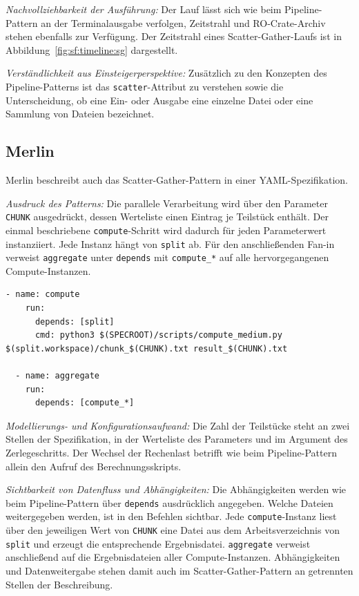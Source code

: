 \emph{Nachvollziehbarkeit der Ausführung:} Der Lauf lässt sich wie
beim Pipeline-Pattern an der Terminalausgabe verfolgen, Zeitstrahl
und RO-Crate-Archiv stehen ebenfalls zur Verfügung. Der Zeitstrahl
eines Scatter-Gather-Laufs ist in
Abbildung~\ref{fig:sf:timeline:sg} dargestellt.

\emph{Verständlichkeit aus Einsteigerperspektive:} Zusätzlich zu den
Konzepten des Pipeline-Patterns ist das \texttt{scatter}-Attribut zu
verstehen sowie die Unterscheidung, ob eine Ein- oder Ausgabe eine
einzelne Datei oder eine Sammlung von Dateien bezeichnet.

\subsection{Merlin}
\label{sec:lokal:sg:merlin}

Merlin beschreibt auch das Scatter-Gather-Pattern in einer
YAML-Spezifikation.

\emph{Ausdruck des Patterns:} Die parallele Verarbeitung wird über
den Parameter \texttt{CHUNK} ausgedrückt, dessen Werteliste einen
Eintrag je Teilstück enthält. Der einmal beschriebene
\texttt{compute}-Schritt wird dadurch für jeden Parameterwert
instanziiert. Jede Instanz hängt von \texttt{split} ab. Für den
anschließenden Fan-in verweist \texttt{aggregate} unter
\texttt{depends} mit \texttt{compute\_*} auf alle hervorgegangenen Compute-Instanzen.

\begin{lstlisting}[caption={Parametrisierter Verarbeitungsschritt und Fan-in (Merlin, Scatter-Gather)},label={lst:sg:me}]
  - name: compute
    run:
      depends: [split]
      cmd: python3 $(SPECROOT)/scripts/compute_medium.py $(split.workspace)/chunk_$(CHUNK).txt result_$(CHUNK).txt

  - name: aggregate
    run:
      depends: [compute_*]
\end{lstlisting}

\emph{Modellierungs- und Konfigurationsaufwand:} Die Zahl der
Teilstücke steht an zwei Stellen der Spezifikation, in der
Werteliste des Parameters und im Argument des Zerlegeschritts. Der
Wechsel der Rechenlast betrifft wie beim Pipeline-Pattern allein den
Aufruf des Berechnungsskripts.

\emph{Sichtbarkeit von Datenfluss und Abhängigkeiten:} Die
Abhängigkeiten werden wie beim Pipeline-Pattern über
\texttt{depends} ausdrücklich angegeben. Welche Dateien
weitergegeben werden, ist in den Befehlen sichtbar. Jede
\texttt{compute}-Instanz liest über den jeweiligen Wert von
\texttt{CHUNK} eine Datei aus dem Arbeitsverzeichnis von
\texttt{split} und erzeugt die entsprechende Ergebnisdatei.
\texttt{aggregate} verweist anschließend auf die Ergebnisdateien
aller Compute-Instanzen. Abhängigkeiten und Datenweitergabe stehen
damit auch im Scatter-Gather-Pattern an getrennten Stellen der
Beschreibung.

